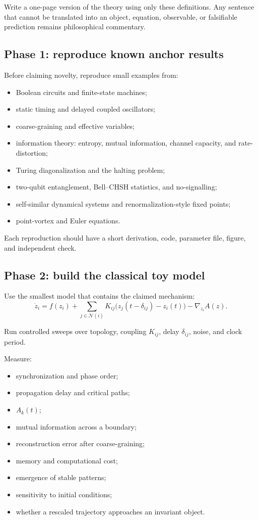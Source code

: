 \documentclass[11pt]{article}
\theoremstyle{definition}
\theoremstyle{plain}
\theoremstyle{remark}
\begin{document}
Write a one-page version of the theory using only these definitions. Any sentence that cannot be translated into an object, equation, observable, or falsifiable prediction remains philosophical commentary.

\subsection{Phase 1: reproduce known anchor results}

Before claiming novelty, reproduce small examples from:
\begin{itemize}
  \item Boolean circuits and finite-state machines;
  \item static timing and delayed coupled oscillators;
  \item coarse-graining and effective variables;
  \item information theory: entropy, mutual information, channel capacity, and rate-distortion;
  \item Turing diagonalization and the halting problem;
  \item two-qubit entanglement, Bell--CHSH statistics, and no-signalling;
  \item self-similar dynamical systems and renormalization-style fixed points;
  \item point-vortex and Euler equations.
\end{itemize}

Each reproduction should have a short derivation, code, parameter file, figure, and independent check.

\subsection{Phase 2: build the classical toy model}

Use the smallest model that contains the claimed mechanism:
\begin{equation}
  \dot{z}_i=f(z_i)+\sum_{j\in\mathcal{N}(i)}
  K_{ij}\bigl(z_j(t-\delta_{ij})-z_i(t)\bigr)
  -\nabla_{z_i}A(z).
  \label{eq:coupled-node-model}
\end{equation}

Run controlled sweeps over topology, coupling $K_{ij}$, delay $\delta_{ij}$, noise, and clock period.

Measure:
\begin{itemize}
  \item synchronization and phase order;
  \item propagation delay and critical paths;
  \item $A_k(t)$;
  \item mutual information across a boundary;
  \item reconstruction error after coarse-graining;
  \item memory and computational cost;
  \item emergence of stable patterns;
  \item sensitivity to initial conditions;
  \item whether a rescaled trajectory approaches an invariant object.
\end{itemize}
\end{document}
